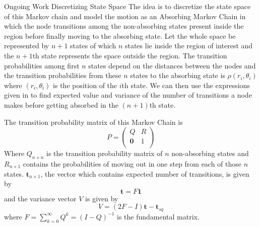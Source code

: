 \documentclass{beamer}
\begin{document}
\begin{frame}{Ongoing Work} {Discretizing State Space}
The idea is to discretize the state space of this Markov chain and model the motion as an 
Absorbing Markov Chain in which the node transitions among the non-absorbing states present 
inside the region before finally moving to the absorbing state. 
Let the whole space be represented by $n+1$ states of which $n$ states lie inside the region 
of interest and the $n+1$th state represents the space outside the region. The transition 
probabilities among first $n$ states depend on the distances between the nodes and the 
transition probabilities from these $n$ states to the absorbing state is $\rho(r_i,\theta_i)$ 
where $(r_i,\theta_i)$ is the position of the $i$th state. We can then use the expressions 
given in \cite{wiki:markovWiki} to find expected value and variance of the number of
transitions a node makes before getting absorbed in the $(n+1)$th state. 
\end{frame}

\begin{frame}
The transition 
probability matrix of this Markov Chain is  
\begin{equation*}
	P  = \left(
	\begin{array}{cc}
	Q & R \\
		\mathbf{0} & 1 \\
	\end{array} \right)
\end{equation*}
	Where $Q_{n \times n}$ is the transition probability matrix of $n$ non-absorbing 
	states and $R_{n\times1}$ contains the probabilities of moving out in one step from 
	each of those $n$ states. 
	 $\mathbf{t}_{n \times 1}$, the vector which contains expected number of transitions, 
	 is given by
\begin{equation*}
	\mathbf{t} = F\mathbf{1}
\end{equation*}
and the variance vector $V$ is given by
\begin{equation*}
	 V = (2F-I)\mathbf{t} - \mathbf{t}_{sq}
\end{equation*}
where $F = \sum_{k=0}^{\infty} Q^k = (I-Q)^{-1}$ is the fundamental matrix.
\end{frame}
\end{document}
